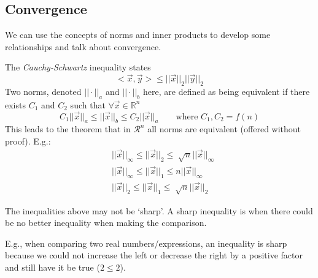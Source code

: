 \documentclass[12pt]{article}
\begin{document}
\subsection{Convergence}
We can use the concepts of norms and inner products to develop some relationships and talk about convergence. 

The \textit{Cauchy-Schwartz} inequality states
%
\begin{equation}
< \vec{x}, \vec{y} > \leq ||\vec{x}||_2 ||\vec{y}||_2 \nonumber
\end{equation}
%
Two norms, denoted $|| \cdot ||_a$ and $|| \cdot ||_b$ here, are defined as being equivalent if there exists $C_1$ and $C_2$ such that $\forall \vec{x} \in \mathbb{R}^n$
%
\begin{equation}
C_1 ||\vec{x}||_a \leq ||\vec{x}||_b \leq C_2 ||\vec{x}||_a \qquad \text{where } C_1, C_2 = f(n) \nonumber
\end{equation}
%
This leads to the theorem that in $\mathcal{R}^n$ all norms are equivalent (offered without proof). E.g.:
\begin{align}
& ||\vec{x}||_{\infty} \leq ||\vec{x}||_2 \leq \sqrt[]{n} ||\vec{x}||_{\infty} \nonumber \\
%
& ||\vec{x}||_{\infty} \leq ||\vec{x}||_1 \leq n ||\vec{x}||_{\infty} \nonumber \\
%
& ||\vec{x}||_2 \leq ||\vec{x}||_1 \leq \sqrt[]{n} ||\vec{x}||_2 \nonumber
\end{align}

The inequalities above may not be `sharp'. A sharp inequality is when there could be no better inequality when making the comparison. 

E.g., when comparing two real numbers/expressions, an inequality is sharp because we could not increase the left or decrease the right by a positive factor and still have it be true ($2 \leq 2$). 
\end{document}

